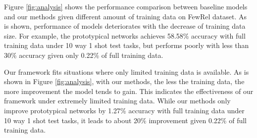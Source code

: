 Figure \ref{fig:analysis} shows the performance comparison between baseline models and our methods given different amount of training data on FewRel dataset. As is shown, performance of models deteriorates with the decrease of training data size. For example, the prototypical networks achieves 58.58\% accuracy with full training data under 10 way 1 shot test tasks, but performs poorly with less than 30\% accuracy given only 0.22\% of full training data.

Our framework fits situations where only limited training data is available. As is shown in Figure \ref{fig:analysis}, with our methods, the less the training data, the more improvement the model tends to gain. This indicates the effectiveness of our framework under extremely limited training data. While our methods only improve prototypical networks by 1.27\% accuracy with full training data under 10 way 1 shot test tasks, it leads to about 20\% improvement given 0.22\% of full training data.

%


